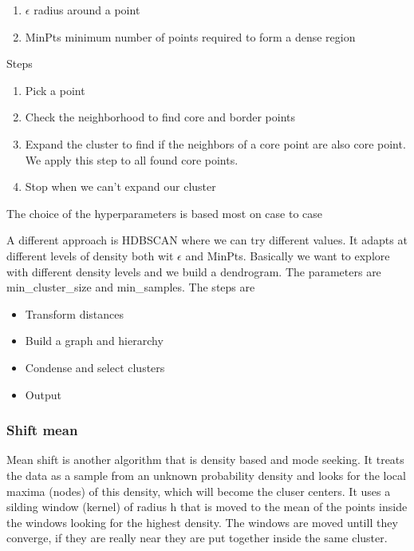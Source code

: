 \begin{enumerate}
    \item $\epsilon$ \ra radius around a point
    \item MinPts \ra minimum number of points required to form a dense region
\end{enumerate}

Steps 
\begin{enumerate}
    \item Pick a point
    \item Check the neighborhood to find core and border points
    \item Expand the cluster to find if the neighbors of a core point are also core point. We apply this step to all found core points.
    \item Stop when we can't expand our cluster
\end{enumerate}


The choice of the hyperparameters is based most on case to case

\vspace{10pt}

A different approach is HDBSCAN where we can try different values. It adapts at different levels of density both wit $\epsilon$ and MinPts. Basically we want to explore with different density levels and we build a dendrogram.
The parameters are min\_cluster\_size and min\_samples. The steps are

\begin{itemize}
    \item Transform distances
    \item Build a graph and hierarchy
    \item Condense and select clusters
    \item Output
\end{itemize}

\subsubsection{Shift mean}

Mean shift is another algorithm that is density based and mode seeking. It treats the data as a sample from an unknown probability density and looks for the local maxima (nodes) of this density, which will become the cluser centers. It uses a silding window (kernel) of radius h that is moved to the mean of the points inside the windows looking for the highest density. The windows are moved untill they converge, if they are really near they are put together inside the same cluster. 

